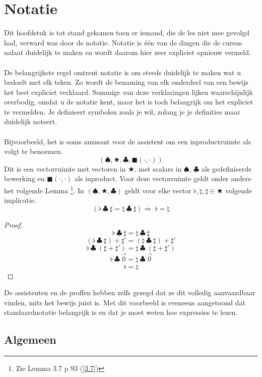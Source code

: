 \documentclass[lineaire_algebra_oplossingen.tex]{subfiles}
\begin{document}
\chapter{Notatie}
Dit hoofdstuk is tot stand gekomen toen er iemand, die de les niet mee gevolgd had, verward was door de notatie.
Notatie is \'e\'en van de dingen die de cursus nalaat duidelijk te maken en wordt daarom hier zeer expliciet opnieuw vermeld.\\\\
De belangrijkste regel omtrent notatie is om steeds duidelijk te maken wat u bedoelt met elk teken.
Zo wordt de benaming van elk onderdeel van een bewijs het best expliciet verklaard.
Sommige van deze verklaringen lijken waarschijnlijk overbodig, omdat u de notatie kent, maar het is toch belangrijk om het expliciet te vermelden. Je definieert symbolen zoals je wil, zolang je je definities  maar duidelijk noteert.\\\\
Bijvoorbeeld, het is soms amusant voor de assistent om een inproductruimte als volgt te benoemen.
\[
(\spadesuit,\bigstar,\clubsuit,\blacksquare(\cdot,\cdot))
\]
Dit is een vectorruimte met vectoren in $\bigstar$, met scalars in $\spadesuit$, $\clubsuit$ als gedefinieerde bewerking en $\blacksquare(\cdot,\cdot)$ als inproduct.
Voor deze vectorruimte geldt onder andere het volgende Lemma \footnote{Zie Lemma 3.7 p 93 (\ref{3.7})}.
In $(\spadesuit,\bigstar,\clubsuit)$ geldt voor elke vector $\flat,\natural,\sharp \in \bigstar$ volgende implicatie.
\[
(\flat\ \clubsuit\ \sharp = \natural\ \clubsuit\ \sharp) \Rightarrow\ \flat = \natural
\]
\begin{proof}
\[
\flat\ \clubsuit\ \sharp = \natural\ \clubsuit\ \sharp
\]
\[
(\flat\ \clubsuit\ \sharp)+\sharp' = (\natural\ \clubsuit\ \sharp)+\sharp'
\]
\[
\flat\ \clubsuit\ (\sharp+\sharp') = \natural\ \clubsuit\ (\sharp+\sharp')
\]
\[
\flat\ \clubsuit\ \vec{0} = \natural\ \clubsuit\ \vec{0}
\]
\[
\flat = \natural
\]
\end{proof}
\noindent De assistenten en de proffen hebben zelfs gezegd dat ze dit volledig aanvaardbaar vinden, mits het bewijs juist is.
Met dit voorbeeld is eveneens aangetoond dat standaardnotatie belangrijk is en dat je moet weten hoe expressies te lezen.

\section{Algemeen}
\end{document}
